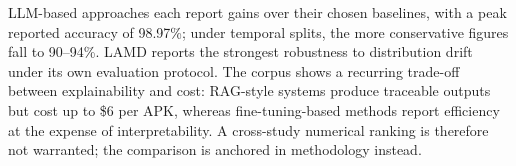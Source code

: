 \begin{tcolorbox}[
    title=\textbf{RQ2 -- Key Takeaways},
    colback=white,
    colframe=blue!60!black,
    colbacktitle=blue!60!black,
    fonttitle=\bfseries\color{white},
    boxrule=0.5pt
]
LLM-based approaches each report gains over their chosen baselines, with a peak reported accuracy of 98.97\%; under temporal splits, the more conservative figures fall to 90--94\%. LAMD reports the strongest robustness to distribution drift under its own evaluation protocol. The corpus shows a recurring trade-off between explainability and cost: RAG-style systems produce traceable outputs but cost up to \$6 per APK, whereas fine-tuning-based methods report efficiency at the expense of interpretability. A cross-study numerical ranking is therefore not warranted; the comparison is anchored in methodology instead.
\end{tcolorbox}
